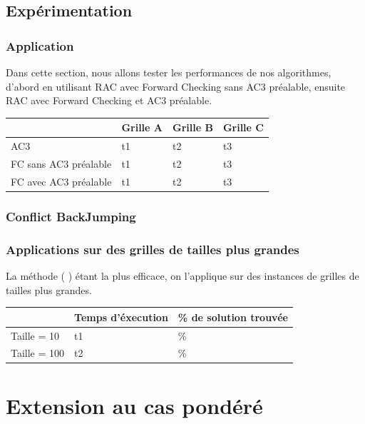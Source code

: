 \documentclass[11pt, letterpaper]{article}
\begin{document}
\subsection{Exp\'{e}rimentation}

\subsubsection*{Application}

Dans cette section, nous allons tester les performances de nos algorithmes, d'abord en utilisant RAC avec Forward Checking sans AC3 pr\'{e}alable, ensuite RAC avec Forward Checking et AC3 pr\'{e}alable.

\bigskip

\noindent
\begin{tabularx}{\textwidth}{ |X|X|X|X| }
\hline
 & Grille A & Grille B & Grille C  \\
\hline
AC3 & t1 & t2 & t3 \\
\hline 
FC sans AC3 pr\'{e}alable & t1 & t2 & t3  \\
\hline
FC avec AC3 pr\'{e}alable & t1 & t2 & t3  \\
\hline
\end{tabularx}

\subsubsection*{Conflict BackJumping}

\subsubsection*{Applications sur des grilles de tailles plus grandes}

La m\'{e}thode ( ) \'{e}tant la plus efficace, on l'applique sur des instances de grilles de tailles plus grandes.

\bigskip

\noindent
\begin{tabularx}{\textwidth}{ |X|X|X| }
\hline
 & Temps d'\'{e}xecution & \% de solution trouv\'{e}e  \\
\hline
Taille = 10 & t1 & \% \\
\hline 
Taille = 100 & t2 & \%  \\
\hline
\end{tabularx}

\newpage

\section{Extension au cas pond\'{e}r\'{e}}
\end{document}
